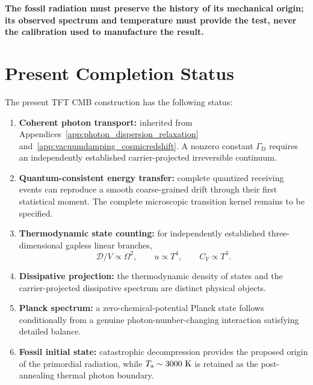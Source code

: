\medskip
\noindent\textbf{The fossil radiation must preserve
the history of its mechanical origin; its observed
spectrum and temperature must provide the test,
never the calibration used to manufacture the result.}

\section{Present Completion Status}

The present TFT CMB construction has the following status:

\begin{enumerate}

    \item
    \textbf{Coherent photon transport:}
    inherited from
    Appendices~\ref{app:photon_dispersion_relaxation}
    and~\ref{app:vacuumdamping_cosmicredshift}.
    A nonzero constant
    \(\Gamma_{\mathrm D}\)
    requires an independently established carrier-projected irreversible
    continuum.

    \item
    \textbf{Quantum-consistent energy transfer:}
    complete quantized receiving events can reproduce a smooth
    coarse-grained drift through their first statistical moment.
    The complete microscopic transition kernel remains to be specified.

    \item
    \textbf{Thermodynamic state counting:}
    for independently established three-dimensional gapless linear branches,
    \[
        \mathcal D/V\propto\Omega^2,
        \qquad
        u\propto T^4,
        \qquad
        C_V\propto T^3.
    \]

    \item
    \textbf{Dissipative projection:}
    the thermodynamic density of states and the carrier-projected dissipative
    spectrum are distinct physical objects.

    \item
    \textbf{Planck spectrum:}
    a zero-chemical-potential Planck state follows conditionally from a
    genuine photon-number-changing interaction satisfying detailed balance.

    \item
    \textbf{Fossil initial state:}
    catastrophic decompression provides the proposed origin of the primordial
    radiation, while
    \(T_{\mathrm a}\sim3000~{\rm K}\)
    is retained as the post-annealing thermal photon boundary.


\end{enumerate}

